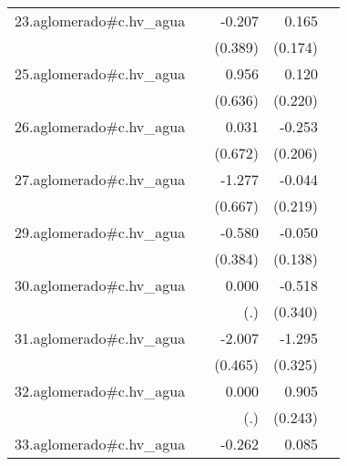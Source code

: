 {\begin{longtable}{l*{4}{D{.}{.}{-1}}}
\addlinespace
23.aglomerado#c.hv\_agua&                     &      -0.207         &       0.165         &                     \\
            &                     &     (0.389)         &     (0.174)         &                     \\
\addlinespace
25.aglomerado#c.hv\_agua&                     &       0.956         &       0.120         &                     \\
            &                     &     (0.636)         &     (0.220)         &                     \\
\addlinespace
26.aglomerado#c.hv\_agua&                     &       0.031         &      -0.253         &                     \\
            &                     &     (0.672)         &     (0.206)         &                     \\
\addlinespace
27.aglomerado#c.hv\_agua&                     &      -1.277         &      -0.044         &                     \\
            &                     &     (0.667)         &     (0.219)         &                     \\
\addlinespace
29.aglomerado#c.hv\_agua&                     &      -0.580         &      -0.050         &                     \\
            &                     &     (0.384)         &     (0.138)         &                     \\
\addlinespace
30.aglomerado#c.hv\_agua&                     &       0.000         &      -0.518         &                     \\
            &                     &         (.)         &     (0.340)         &                     \\
\addlinespace
31.aglomerado#c.hv\_agua&                     &      -2.007\sym{***}&      -1.295\sym{***}&                     \\
            &                     &     (0.465)         &     (0.325)         &                     \\
\addlinespace
32.aglomerado#c.hv\_agua&                     &       0.000         &       0.905\sym{***}&                     \\
            &                     &         (.)         &     (0.243)         &                     \\
\addlinespace
33.aglomerado#c.hv\_agua&                     &      -0.262         &       0.085         &                     \\

\end{longtable}}
